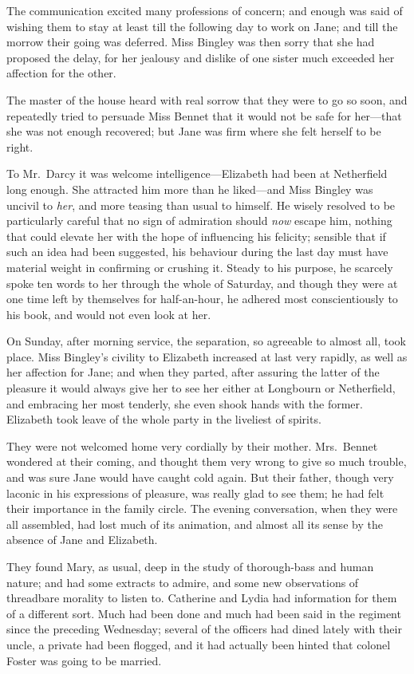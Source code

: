 \documentclass[12pt,english]{book}
\begin{document}
The communication excited many professions of concern; and enough
was said of wishing them to stay at least till the following day to
work on Jane; and till the morrow their going was deferred. Miss Bingley
was then sorry that she had proposed the delay, for her jealousy and
dislike of one sister much exceeded her affection for the other.

The master of the house heard with real sorrow that they were to go
so soon, and repeatedly tried to persuade Miss Bennet that it would
not be safe for her\mbox{---}that she was not enough recovered; but
Jane was firm where she felt herself to be right.

To Mr.\ Darcy it was welcome in\-t\-el\-li\-g\-ence\mbox{---}Elizabeth
had been at Netherfield long enough. She attracted him more than he
liked\mbox{---}and Miss Bingley was uncivil to \textit{her}, and
more teasing than usual to himself. He wisely resolved to be particularly
careful that no sign of admiration should \textit{now} escape him,
nothing that could elevate her with the hope of influencing his felicity;
sensible that if such an idea had been suggested, his behaviour during
the last day must have material weight in confirming or crushing it.
Steady to his purpose, he scarcely spoke ten words to her through
the whole of Saturday, and though they were at one time left by themselves
for half-an-hour, he adhered most conscientiously to his book, and
would not even look at her.

On Sunday, after morning service, the separation, so agreeable to
almost all, took place. Miss Bingley's civility to Elizabeth increased
at last very rapidly, as well as her affection for Jane; and when
they parted, after assuring the latter of the pleasure it would always
give her to see her either at Longbourn or Netherfield, and embracing
her most tenderly, she even shook hands with the former. Elizabeth
took leave of the whole party in the liveliest of spirits.

They were not welcomed home very cordially by their mother. Mrs.\ Bennet
wondered at their coming, and thought them very wrong to give so much
trouble, and was sure Jane would have caught cold again. But their
father, though very laconic in his expressions of pleasure, was really
glad to see them; he had felt their importance in the family circle.
The evening conversation, when they were all assembled, had lost much
of its animation, and almost all its sense by the absence of Jane
and Elizabeth.

They found Mary, as usual, deep in the study of thorough-bass and
human nature; and had some extracts to admire, and some new observations
of threadbare morality to listen to. Catherine and Lydia had information
for them of a different sort. Much had been done and much had been
said in the regiment since the preceding Wednesday; several of the
officers had dined lately with their uncle, a private had been flogged,
and it had actually been hinted that colonel Foster was going to be
married.
\end{document}

